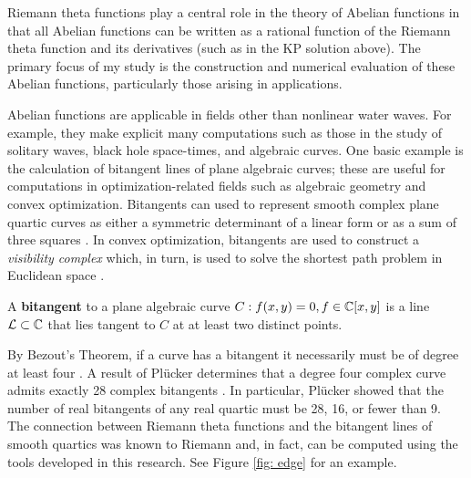 Riemann theta functions play a central role in the theory of Abelian
functions in that all Abelian functions can be written as a rational
function of the Riemann theta function and its derivatives (such as in
the KP solution above).  The primary focus of my study is the
construction and numerical evaluation of these Abelian functions,
particularly those arising in applications.

Abelian functions are applicable in fields other than nonlinear water
waves. For example, they make explicit many computations such as those
in the study of solitary waves, black hole space-times, and algebraic
curves. One basic example is the calculation of bitangent lines of plane
algebraic curves; these are useful for computations in
optimization-related fields such as algebraic geometry and convex
optimization. Bitangents can used to represent smooth complex plane
quartic curves as either a symmetric determinant of a linear form or as
a sum of three squares \cite{PSV11}. In convex optimization, bitangents
are used to construct a {\it visibility complex} which, in turn, is used
to solve the shortest path problem in Euclidean space
\cite{PocchiolaVegter93}.

\begin{definition} \label{def: bitangent}
  A {\bf bitangent} to a plane algebraic curve $C : f(x,y) = 0, f \in
  \operatorname{\mathbb{C}}[x,y]$ is a line $\mathcal{L} \subset \operatorname{\mathbb{C}}$ that lies tangent to $C$
  at at least two distinct points.
\end{definition}

By Bezout's Theorem, if a curve has a bitangent it necessarily must be
of degree at least four \cite{Bezout1779}. A result of Pl\"{u}cker
determines that a degree four complex curve admits exactly 28 complex
bitangents \cite{Plucker34}. In particular, Pl\"{u}cker showed that the
number of real bitangents of any real quartic must be 28, 16, or fewer
than 9. The connection between Riemann theta functions and the bitangent
lines of smooth quartics was known to Riemann \cite{Baker97,Riemann76}
and, in fact, can be computed using the tools developed in this
research. See Figure \ref{fig: edge} for an example.


